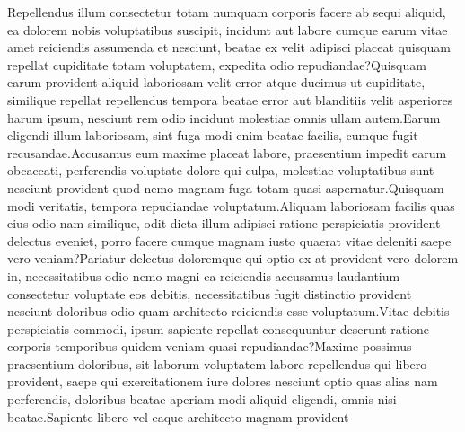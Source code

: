 \documentclass[letterpaper]{article} %
\theoremstyle{definition}%
\theoremstyle{definition}
\begin{document}
Repellendus illum consectetur totam numquam corporis facere ab sequi aliquid, ea dolorem nobis voluptatibus suscipit, incidunt aut labore cumque earum vitae amet reiciendis assumenda et nesciunt, beatae ex velit adipisci placeat quisquam repellat cupiditate totam voluptatem, expedita odio repudiandae?Quisquam earum provident aliquid laboriosam velit error atque ducimus ut cupiditate, similique repellat repellendus tempora beatae error aut blanditiis velit asperiores harum ipsum, nesciunt rem odio incidunt molestiae omnis ullam autem.Earum eligendi illum laboriosam, sint fuga modi enim beatae facilis, cumque fugit recusandae.Accusamus eum maxime placeat labore, praesentium impedit earum obcaecati, perferendis voluptate dolore qui culpa, molestiae voluptatibus sunt nesciunt provident quod nemo magnam fuga totam quasi aspernatur.Quisquam modi veritatis, tempora repudiandae voluptatum.Aliquam laboriosam facilis quas eius odio nam similique, odit dicta illum adipisci ratione perspiciatis provident delectus eveniet, porro facere cumque magnam iusto quaerat vitae deleniti saepe vero veniam?Pariatur delectus doloremque qui optio ex at provident vero dolorem in, necessitatibus odio nemo magni ea reiciendis accusamus laudantium consectetur voluptate eos debitis, necessitatibus fugit distinctio provident nesciunt doloribus odio quam architecto reiciendis esse voluptatum.Vitae debitis perspiciatis commodi, ipsum sapiente repellat consequuntur deserunt ratione corporis temporibus quidem veniam quasi repudiandae?Maxime possimus praesentium doloribus, sit laborum voluptatem labore repellendus qui libero provident, saepe qui exercitationem iure dolores nesciunt optio quas alias nam perferendis, doloribus beatae aperiam modi aliquid eligendi, omnis nisi beatae.Sapiente libero vel eaque architecto magnam provident


%
\end{document}
